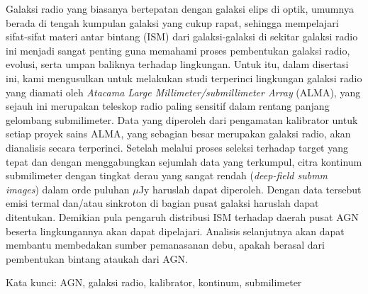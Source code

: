 Galaksi radio yang biasanya bertepatan dengan galaksi elips di optik, umumnya berada di tengah kumpulan galaksi yang cukup rapat, sehingga mempelajari sifat-sifat materi antar bintang (ISM) dari galaksi-galaksi di sekitar galaksi radio ini menjadi sangat penting guna memahami proses pembentukan galaksi radio, evolusi, serta umpan baliknya terhadap lingkungan. Untuk itu, dalam disertasi ini, kami mengusulkan untuk melakukan  studi terperinci lingkungan galaksi radio yang diamati oleh {\it Atacama Large Millimeter/submillimeter Array} (ALMA), yang sejauh ini merupakan teleskop radio paling sensitif dalam rentang panjang gelombang submilimeter. Data yang diperoleh dari pengamatan kalibrator untuk setiap proyek sains ALMA, yang sebagian besar merupakan galaksi radio, akan dianalisis secara terperinci. Setelah melalui proses seleksi terhadap target yang tepat dan dengan menggabungkan sejumlah data yang terkumpul, citra  kontinum submilimeter dengan tingkat derau yang sangat rendah ({\it deep-field submm images}) dalam orde puluhan $\mu$Jy haruslah dapat diperoleh. Dengan data tersebut emisi termal dan/atau sinkroton di bagian pusat galaksi haruslah dapat ditentukan. Demikian pula pengaruh distribusi ISM terhadap daerah pusat AGN beserta lingkungannya akan dapat dipelajari. Analisis selanjutnya akan dapat membantu membedakan sumber pemanasanan debu, apakah berasal dari pembentukan bintang ataukah dari AGN.

\vspace{1em}

\noindent Kata kunci: AGN, galaksi radio, kalibrator, kontinum, submilimeter
\resetparskip




